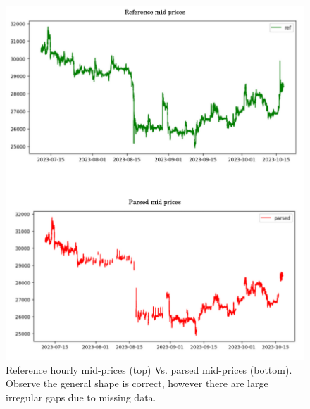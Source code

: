 \begin{figure}[htpb]
    \centering
    \includegraphics[width=1.0\textwidth]{./images/stitched.pdf}
    \caption{Reference hourly mid-prices (top) Vs. parsed mid-prices (bottom). Observe the general shape is correct, however
    there are large irregular gaps due to missing data.}
    \label{missing}
\end{figure}
